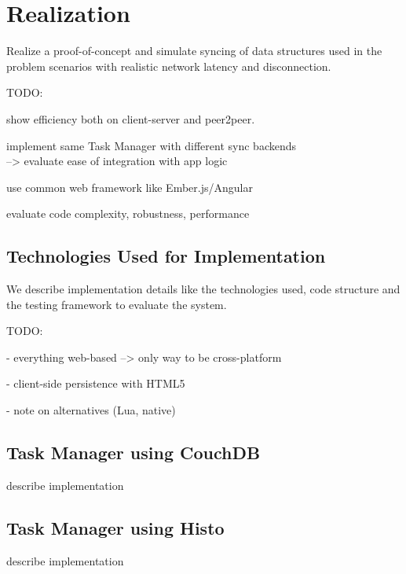 
\chapter{Realization}
\label{sec:realization}

Realize a proof-of-concept and simulate syncing of data structures
used in the problem scenarios with realistic network latency and
disconnection.

TODO:

show efficiency both on client-server and peer2peer.

implement same Task Manager with different sync backends\\
--> evaluate ease of integration with app logic

use common web framework like Ember.js/Angular

evaluate code complexity, robustness, performance

\section{Technologies Used for Implementation}
We describe implementation details like the technologies used, code structure and the testing framework to evaluate the system.

TODO:



- everything web-based --> only way to be cross-platform

- client-side persistence with HTML5

- note on alternatives (Lua, native)

\section{Task Manager using CouchDB}

describe implementation

\section{Task Manager using Histo}

describe implementation
